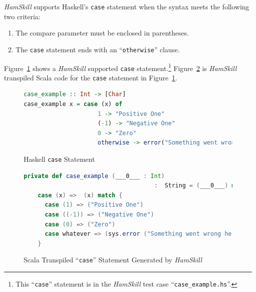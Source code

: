 \documentclass{report}
\begin{document}
\textit{HamSkill} supports Haskell's \texttt{case} statement when the syntax meets the following two criteria:

\begin{enumerate}

\item The compare parameter must be enclosed in parentheses.

\item The \texttt{case} statement ends with an ``\texttt{otherwise}'' clause.

\end{enumerate}

Figure~\ref{fig:haskellCaseStatement} shows a \textit{HamSkill} supported \texttt{case} statement.\footnote{This ``\texttt{case}'' statement is in the \textit{HamSkill} test case ``\texttt{case\_example.hs}''.}  Figure~\ref{fig:scalaCaseStatement} is \textit{HamSkill} transpiled Scala code for the \texttt{case} statement in Figure~\ref{fig:haskellCaseStatement}.

\begin{figure}[H]
\begin{mdframed}
\begin{lstlisting}[language=Haskell, basicstyle=\scriptsize, showstringspaces=false]
case_example :: Int -> [Char]
case_example x = case (x) of
                     1 -> "Positive One"
                     (-1) -> "Negative One"
                     0 -> "Zero"
                     otherwise -> error("Something went wrong here")
\end{lstlisting}
\end{mdframed}
\caption{Haskell \texttt{case} Statement}\label{fig:haskellCaseStatement}
\end{figure}

\begin{figure}[H]
\begin{mdframed}
\begin{lstlisting}[language=Scala, basicstyle=\scriptsize]
private def case_example (___0___ : Int) 
                                     :  String = (___0___) match {
    case (x) =>  (x) match {
      case (1) => ("Positive One")
      case ((-1)) => ("Negative One")
      case (0) => ("Zero")
      case whatever => (sys.error ("Something went wrong here"))
    }
\end{lstlisting}
\end{mdframed}
\caption{Scala Transpiled ``\texttt{case}'' Statement Generated by \textit{HamSkill}}\label{fig:scalaCaseStatement}
\end{figure}
\end{document}
